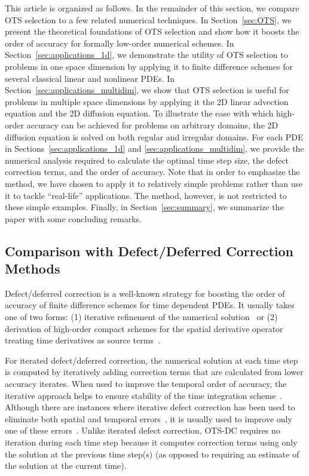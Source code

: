 \documentclass[fleqn,12pt,twoside]{article}
\begin{document}
This article is organized as follows.  In the remainder of this section,
we compare OTS selection to a few related numerical techniques.
In Section~\ref{sec:OTS}, we present the theoretical foundations of 
OTS selection and show how it boosts the order of accuracy for formally
low-order numerical schemes.  
In Section~\ref{sec:applications_1d}, we demonstrate the utility of 
OTS selection to problems in one space dimension by applying it to finite 
difference schemes for several classical linear and nonlinear PDEs.  
In Section~\ref{sec:applications_multidim}, we show that 
OTS selection is useful for problems in multiple space dimensions by applying
it the 2D linear advection equation and the 2D diffusion equation.  To
illustrate the ease with which high-order accuracy can be achieved for
problems on arbitrary domains, the 2D diffusion equation is solved on both
regular and irregular domains.  For each PDE in
Sections~\ref{sec:applications_1d} and \ref{sec:applications_multidim}, we
provide the numerical analysis required to calculate the optimal time step
size, the defect correction terms, and the order of accuracy.  Note that in
order to emphasize the method, we have chosen to apply it to relatively simple
problems rather than use it to tackle ``real-life'' applications.  The method,
however, is not restricted to these simple examples.  Finally, in
Section~\ref{sec:summary}, we summarize the paper with some concluding
remarks.


\subsection{Comparison with Defect/Deferred Correction Methods}
Defect/deferred correction is a well-known strategy for boosting the order of 
accuracy of finite difference schemes for time dependent PDEs.  It usually 
takes one of two forms: 
(1) iterative refinement of the numerical
solution~\cite{pereyra_1968,stetter_1978,gustafsson_2002,kress_2002,kress_2006}
or 
(2) derivation of high-order compact schemes for the spatial derivative 
operator treating time derivatives as source 
terms~\cite{spotz_2001,ito_2005,heidenreich_2007}. 

For iterated defect/deferred correction, the numerical solution at each 
time step is computed by iteratively adding correction terms that are 
calculated from lower accuracy iterates.  When used to improve the 
temporal order of accuracy, the iterative approach helps to ensure 
stability of the time integration scheme~\cite{kress_2006}.  Although there 
are instances where iterative defect correction has been used to eliminate 
both spatial and temporal errors~\cite{gustafsson_2002}, it is usually used to 
improve only one of these errors~\cite{pereyra_1968,kress_2002,kress_2006}.
Unlike iterated defect correction, OTS-DC requires no iteration during each
time step because it computes correction terms using only the solution at the
previous time step(s) (as opposed to requiring an estimate of the solution at
the current time).
\end{document}
